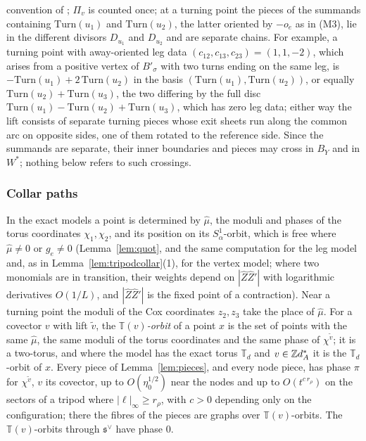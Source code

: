 convention of \cite[\S7.7, Step~2]{CBM}; $\Pi_v$ is counted once; at a turning point the pieces of the summands
containing $\mathrm{Turn}(u_1)$ and $\mathrm{Turn}(u_2)$, the latter oriented by $-o_e$ as in (M3), lie in the different
divisors $D_{u_1}$ and $D_{u_2}$ and are separate chains. For example, a turning point with away-oriented leg data
$(c_{12},c_{13},c_{23})=(1,1,-2)$, which arises from a positive vertex of $B'_\sigma$ with two turns ending on the same leg,
is $-\mathrm{Turn}(u_1)+2\,\mathrm{Turn}(u_2)$ in the basis $(\mathrm{Turn}(u_1),\mathrm{Turn}(u_2))$, or equally
$\mathrm{Turn}(u_2)+\mathrm{Turn}(u_3)$, the two differing by the full disc $\mathrm{Turn}(u_1)-\mathrm{Turn}(u_2)+
\mathrm{Turn}(u_3)$, which has zero leg data; either way the lift consists of separate turning pieces whose exit sheets
run along the common arc on opposite sides, one of them rotated to the reference side. Since the summands are
separate, their inner boundaries and pieces may cross in $B_Y$ and in $W^*$; nothing below refers to such crossings.

\subsubsection*{Collar paths}
In the exact models a point is determined by $\hat\mu$, the moduli and phases of the torus coordinates $\chi_1,\chi_2$, and
its position on its $S^1_\alpha$-orbit, which is free where $\hat\mu\neq0$ or $g_e\ne0$ (Lemma~\ref{lem:quot}, and the same
computation for the leg model and, as in Lemma~\ref{lem:tripodcollar}(1), for the vertex model; where two monomials are in transition, their weights
depend on $|\hat Z\hat Z'|$ with logarithmic derivatives $O(1/L)$, and $|\hat Z\hat Z'|$ is the fixed point of a
contraction). Near a turning point the moduli of the Cox coordinates $z_2,z_3$ take the place of $\hat\mu$. For a covector
$v$ with lift $\tilde v$, the \emph{$\mathbb T(v)$-orbit} of a point $x$ is the set of points with the same $\hat\mu$, the same
moduli of the torus coordinates and the same phase of $\chi^{\tilde v}$; it is a two-torus, and where the model has the
exact torus $\mathbb T_d$ and $v\in\mathbb Z d^*_A$ it is the $\mathbb T_d$-orbit of $x$. Every piece of Lemma~\ref{lem:pieces}, and every node
piece, has phase $\pi$ for $\chi^{\tilde v}$, $v$ its covector, up to $O(\eta_0^{1/2})$ near the nodes and up to
$O(t^{c\,r_\rho})$ on the sectors of a tripod where $|\ell|_\infty\ge r_\rho$, with $c>0$ depending only on
the configuration; there the fibres of the pieces are graphs over $\mathbb T(v)$-orbits. The $\mathbb T(v)$-orbits through
$\mathfrak s^\vee$ have phase $0$.

